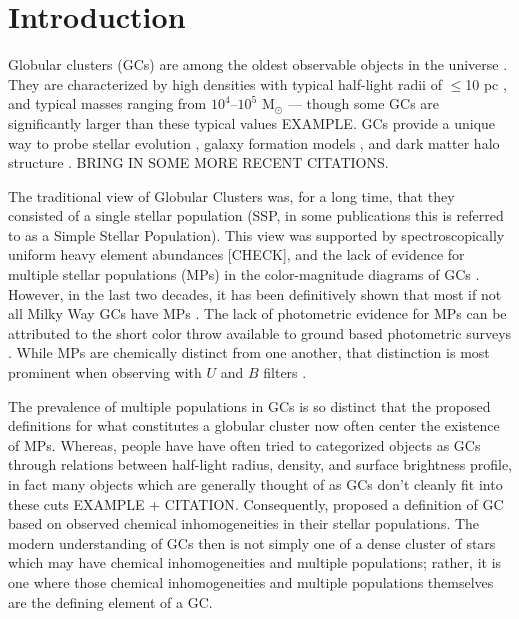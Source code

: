 \section{Introduction}\label{sec:Intro}
Globular clusters (GCs) are among the oldest observable objects in the
universe \citep{Pen11}. They are characterized by high densities with typical
half-light radii of $\le$10 pc \citep{Vanderburg2010}, and typical masses
ranging from $10^{4}$--$10^{5}$ M$_{\odot}$ \citep{Bro06} --- though some GCs
are significantly larger than these typical values {\color{red}EXAMPLE}. GCs
provide a unique way to probe stellar evolution \citep{Bau03}, galaxy formation
models \citep{Boy18,Kra05}, and dark matter halo structure \citep{Hud18}.
{\color{red} BRING IN SOME MORE RECENT CITATIONS.}

The traditional view of Globular Clusters was, for a long time, that they
consisted of a single stellar population (SSP, in some publications this is
referred to as a Simple Stellar Population). This view was supported by
spectroscopically uniform heavy element abundances \citep{Carretta2009}
{\color{red}[CHECK]}, and the lack of evidence for multiple stellar populations
(MPs) in the color-magnitude diagrams of GCs \citep{Milone2017}. However, in
the last two decades, it has been definitively shown that most if not all Milky
Way GCs have MPs \citep{Piotto2015}. The lack of photometric evidence for MPs
can be attributed to the short color throw available to ground based
photometric surveys \citep{Milone20Here17}. While MPs are chemically distinct
from one another, that distinction is most prominent when observing with $U$
and $B$ filters \citep{Sbordone2011}.

The prevalence of multiple populations in GCs is so distinct that the proposed
definitions for what constitutes a globular cluster now often center the
existence of MPs. Whereas, people have have often tried to categorized objects
as GCs through relations between half-light radius, density, and surface
brightness profile, in fact many objects which are generally thought of as GCs
don't cleanly fit into these cuts {\color{red} EXAMPLE + CITATION}.
Consequently, \citet{Carretta2010} proposed a definition of GC based on
observed chemical inhomogeneities in their stellar populations. The modern
understanding of GCs then is not simply one of a dense cluster of stars which
may have chemical inhomogeneities and multiple populations; rather, it is one
where those chemical inhomogeneities and multiple populations themselves are
the defining element of a GC.

